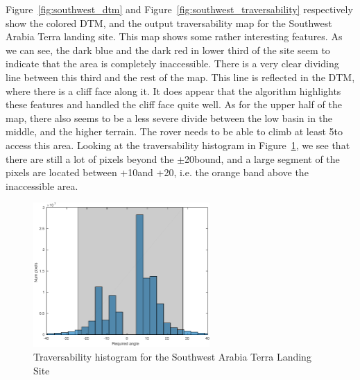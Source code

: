 \documentclass[12pt]{article}
\begin{document}
\par Figure~\ref{fig:southwest_dtm} and Figure~\ref{fig:southwest_traversability} respectively show the colored DTM, and the output traversability map for the Southwest Arabia Terra landing site. This map shows some rather interesting features. As we can see, the dark blue and the dark red in lower third of the site seem to indicate that the area is completely inaccessible. There is a very clear dividing line between this third and the rest of the map. This line is reflected in the DTM, where there is a cliff face along it. It does appear that the algorithm highlights these features and handled the cliff face quite well. As for the upper half of the map, there also seems to be a less severe divide between the low basin in the middle, and the higher terrain. The rover needs to be able to climb at least 5\textdegree to access this area. Looking at the traversability histogram in Figure~\ref{fig:southwest_hist}, we see that there are still a lot of pixels beyond the $\pm$20\textdegree bound, and a large segment of the pixels are located between +10\textdegree and +20\textdegree, i.e. the orange band above the inaccessible area.

\begin{figure}[h!]
  \centering
  \includegraphics[width=0.6\textwidth]{figures/maps/ESP_011844_1855/DTEEC_011844_1855_002812_1855_A01-hist.pdf}
  \caption{Traversability histogram for the Southwest Arabia Terra Landing Site}
  \label{fig:southwest_hist}
\end{figure}
\end{document}
